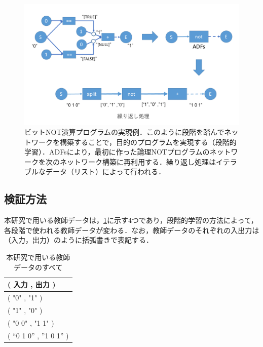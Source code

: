 \documentclass[exploratorypaper]{jsaiart} %
\begin{document}
\begin{figure}[t]
    \begin{center}
        \includegraphics[width=150mm]{bitwise_not.png}
    \end{center}
    \capwidth=130mm %
    \caption{ビットNOT演算プログラムの実現例．このように段階を踏んでネットワークを構築することで，目的のプログラムを実現する（段階的学習）．ADFsにより，最初に作った論理NOTプログラムのネットワークを次のネットワーク構築に再利用する．繰り返し処理はイテラブルなデータ（リスト）によって行われる．}
    \label{fig:bitwise_not}
\end{figure}

\subsection{検証方法}
本研究で用いる教師データは，\ref{tbl:TeacherData}に示す4つであり，段階的学習の方法によって，各段階で使われる教師データが変わる．なお，教師データのそれぞれの入出力は（入力，出力）のように括弧書きで表記する．

\begin{table}[htbp]
\centering
\caption{本研究で用いる教師データのすべて}
\label{tbl:TeacherData}
\begin{tabular}{l}
    \hline
     ( 入力 , 出力 ) \\
    \hline \hline
    ( "0" , "1" ) \\
    ( "1" , "0" ) \\
    ( "0 0" , "1 1" ) \\
    ( “0 1 0” , ”1 0 1” ) \\
    \hline
\end{tabular}
\end{table}
\end{document}
